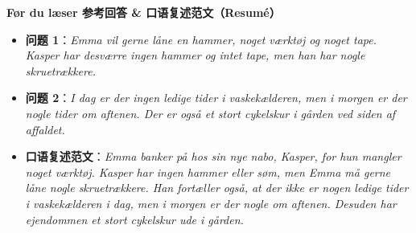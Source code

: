\begin{answerbox}
\textbf{Før du læser 参考回答 \& 口语复述范文（Resumé）}
\begin{itemize}
  \item \textbf{问题 1}：\textit{Emma vil gerne låne en hammer, noget værktøj og noget tape. Kasper har desværre ingen hammer og intet tape, men han har nogle skruetrækkere.}
  \item \textbf{问题 2}：\textit{I dag er der ingen ledige tider i vaskekælderen, men i morgen er der nogle tider om aftenen. Der er også et stort cykelskur i gården ved siden af affaldet.}
  \item \textbf{口语复述范文}：\textit{Emma banker på hos sin nye nabo, Kasper, for hun mangler noget værktøj. Kasper har ingen hammer eller søm, men Emma må gerne låne nogle skruetrækkere. Han fortæller også, at der ikke er nogen ledige tider i vaskekælderen i dag, men i morgen er der nogle om aftenen. Desuden har ejendommen et stort cykelskur ude i gården.}
\end{itemize}
\end{answerbox}
